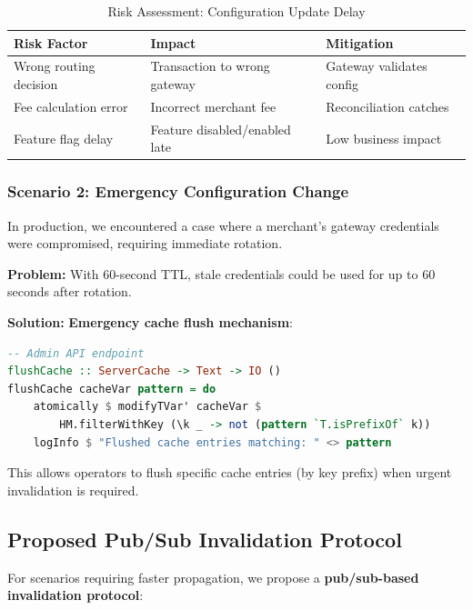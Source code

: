 \documentclass[12pt,a4paper]{report}
\begin{document}
\begin{table}[h]
\centering
\begin{tabular}{@{} l l l @{}}
\toprule
\textbf{Risk Factor} & \textbf{Impact} & \textbf{Mitigation} \\
\midrule
Wrong routing decision & Transaction to wrong gateway & Gateway validates config \\
Fee calculation error & Incorrect merchant fee & Reconciliation catches \\
Feature flag delay & Feature disabled/enabled late & Low business impact \\
\bottomrule
\end{tabular}
\caption{Risk Assessment: Configuration Update Delay}
\label{tab:config-risk}
\end{table}

\subsubsection{Scenario 2: Emergency Configuration Change}

In production, we encountered a case where a merchant's gateway credentials were compromised, requiring immediate rotation.

\textbf{Problem:} With 60-second TTL, stale credentials could be used for up to 60 seconds after rotation.

\textbf{Solution:} \textbf{Emergency cache flush mechanism}:

\begin{lstlisting}[language=Haskell, caption={Emergency Cache Flush}]
-- Admin API endpoint
flushCache :: ServerCache -> Text -> IO ()
flushCache cacheVar pattern = do
    atomically $ modifyTVar' cacheVar $ 
        HM.filterWithKey (\k _ -> not (pattern `T.isPrefixOf` k))
    logInfo $ "Flushed cache entries matching: " <> pattern
\end{lstlisting}

This allows operators to flush specific cache entries (by key prefix) when urgent invalidation is required.

\subsection{Proposed Pub/Sub Invalidation Protocol}

For scenarios requiring faster propagation, we propose a \textbf{pub/sub-based invalidation protocol}:
\end{document}
